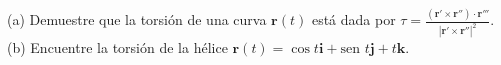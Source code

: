 \item (a) Demuestre que la torsión de una curva $\mathbf{r}(t)$ está dada por $\tau = \frac{(\mathbf{r}' \times \mathbf{r}'') \cdot \mathbf{r}'''}{|\mathbf{r}' \times \mathbf{r}''|^2}$. \\
    (b) Encuentre la torsión de la hélice $\mathbf{r}(t) = \cos t \mathbf{i} + \text{sen } t \mathbf{j} + t\mathbf{k}$.
